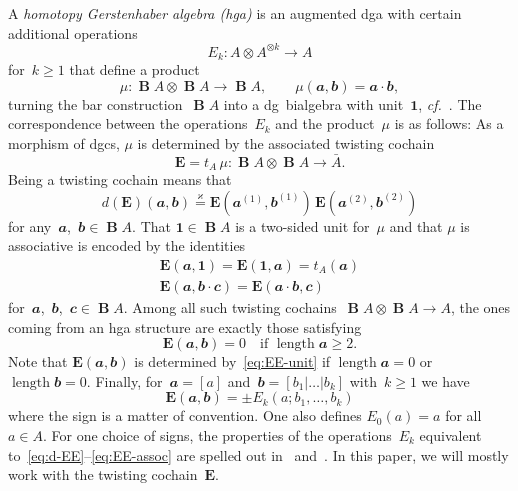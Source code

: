 \documentclass[letterpaper]{amsart}
\numberwithin{equation}{section}
\theoremstyle{plain}
\theoremstyle{definition}
\theoremstyle{remark}
\let\newterm\emph
\def\cf{\emph{cf.}}
\DeclareMathOperator{\BB}{\mathbf{B}}
\def\BBone{\mathbf{1}}
\DeclareMathOperator{\length}{length}
\def\aa{\mathbfit{a}}
\def\bb{\mathbfit{b}}
\def\cc{\mathbfit{c}}
\def\EE{\mathbf{E}}
\def\swee#1#2{#1^{(#2)}}
\let\KS\varkappa
\def\eqKS{\stackrel{\KS}{=}}
\begin{document}
A \newterm{homotopy Gerstenhaber algebra (hga)} is an augmented dga with certain additional operations
\begin{equation}
  E_{k}\colon A\otimes A^{\otimes k} \to A
\end{equation}
for~$k\ge1$ that define a product
\begin{equation}
  \mu\colon \BB A \otimes \BB A \to \BB A,
  \qquad
  \mu(\aa,\bb) = \aa\cdot\bb,
\end{equation}
turning the bar construction~$\BB A$ into a dg~bialgebra with unit~$\BBone$, \cf~\cite[Def.~2, Sec.~3.2]{GerstenhaberVoronov:1995}.
The correspondence between the operations~$E_{k}$ and the product~$\mu$ is as follows:
As a morphism of dgcs, $\mu$ is determined by the associated twisting cochain
\begin{equation}
  \EE = t_{A}\,\mu\colon \BB A\otimes \BB A\to \bar A.
\end{equation}
Being a twisting cochain means that
\begin{equation}
  \label{eq:d-EE}
  d(\EE)(\aa,\bb) \eqKS \EE(\swee{\aa}{1},\swee{\bb}{1})\,\EE(\swee{\aa}{2},\swee{\bb}{2})
\end{equation}
for any~$\aa$,~$\bb\in \BB A$.
That $\BBone\in \BB A$ is a two-sided unit for~$\mu$ and that $\mu$ is associative
is encoded by the identities
\begin{gather}
  \label{eq:EE-unit}
  \EE(\aa,\BBone) = \EE(\BBone,\aa) = t_{A}(\aa) \\
  \label{eq:EE-assoc}
  \EE(\aa,\bb\cdot\cc) = \EE(\aa\cdot\bb,\cc)
\end{gather}
for~$\aa$,~$\bb$,~$\cc\in \BB A$.
Among all such twisting cochains~$\BB A\otimes \BB A\to A$,
the ones coming from an hga structure are exactly those satisfying
\begin{equation}
  \EE(\aa,\bb) = 0 \quad\text{if $\length\aa\ge2$}.
\end{equation}
Note that $\EE(\aa,\bb)$ is determined by~\eqref{eq:EE-unit} if $\length\aa=0$ or~$\length\bb=0$.
Finally, for~$\aa=[a]$ and~$\bb=[b_{1}|\dots|b_{k}]$ with~$k\ge1$ we have
\begin{equation}
  \EE(\aa,\bb) = \pm E_{k}(a;b_{1},\dots,b_{k})
\end{equation}
where the sign is a matter of convention. One also defines $E_{0}(a)=a$ for all~$a\in A$. For one choice of signs,
the properties of the operations~$E_{k}$ equivalent to~\eqref{eq:d-EE}--\eqref{eq:EE-assoc}
are spelled out in~\cite[Sec.~3.1]{Franz:hgashc} and~\cite[Sec.~6.1]{Franz:homog}.
In this paper, we will mostly work with the twisting cochain~$\EE$.
\end{document}
